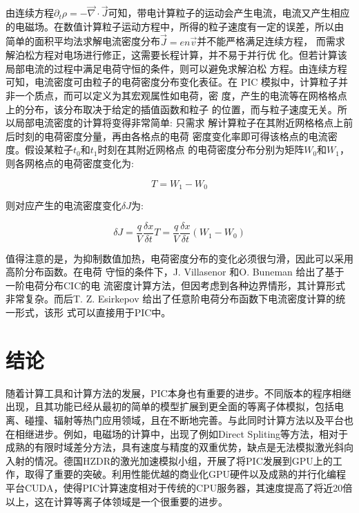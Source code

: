 由连续方程${\partial}_t \rho = - \vec{\nabla} \cdot \vec{J}$可知，带电计算粒子的运动会产生电流，电流又产生相应的电磁场。在数值计算粒子运动方程中，所得的粒子速度有一定的误差，所以由
简单的面积平均法求解电流密度分布$\vec{J}=en\vec{v}$并不能严格满足连续方程，
而需求解泊松方程对电场进行修正\cite{hockney1988computer}，这需要长程计算，并不易于并行优
化。但若计算该局部电流的过程中满足电荷守恒的条件，则可以避免求解泊松
方程。由连续方程可知，电流密度可由粒子的电荷密度分布变化表征。在
PIC 模拟中，计算粒子并非一个质点，而可以定义为其宏观属性如电荷，密
度，产生的电流等在网格格点上的分布，该分布取决于给定的插值函数和粒子
的位置，而与粒子速度无关。所以局部电流密度的计算将变得非常简单: 只需求
解计算粒子在其附近网格格点上前后时刻的电荷密度分量，再由各格点的电荷
密度变化率即可得该格点的电流密度。假设某粒子$t_0$和$t_1$时刻在其附近网格点
的电荷密度分布分别为矩阵$W_0$和$W_1$，则各网格点的电荷密度变化为:


\begin{equation}
T=W_1-W_0
\end{equation}

则对应产生的电流密度变化$\delta J$为:

\begin{equation}
\delta J =\frac{q}{V} \frac{\delta x}{\delta t} T = \frac{q}{V} \frac{\delta x}{\delta t}(W_1-W_0)
\end{equation}


值得注意的是，为抑制数值加热，电荷密度分布的变化必须很匀滑，因此可以采用高阶分布函数。在电荷
守恒的条件下，J. Villasenor 和O. Buneman 给出了基于一阶电荷分布CIC的电
流密度计算方法\cite{villasenor1992rigorous}，但因考虑到各种边界情形，其计算形式非常复杂。而后T.
Z. Esirkepov 给出了任意阶电荷分布函数下电流密度计算的统一形式\cite{esirkepov2001exact}，该形
式可以直接用于PIC中。



\section{结论}

随着计算工具和计算方法的发展，PIC本身也有重要的进步。不同版本的程序相继出现，且其功能已经从最初的简单的模型扩展到更全面的等离子体模拟，包括电离、碰撞、辐射等热门应用领域，且在不断地完善。与此同时计算方法以及平台也在相继进步。例如，电磁场的计算中，出现了例如Direct Spliting\cite{sentoku2008numerical}等方法，相对于成熟的有限时域差分方法，具有速度与精度的双重优势，缺点是无法模拟激光斜向入射的情况。德国HZDR的激光加速模拟小组，开展了将PIC发展到GPU上的工作，取得了重要的突破。利用性能优越的商业化GPU硬件以及成熟的并行化编程平台CUDA，使得PIC计算速度相对于传统的CPU服务器，其速度提高了将近20倍以上，这在计算等离子体领域是一个很重要的进步。



